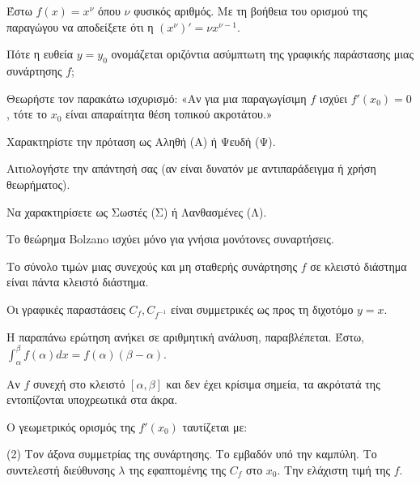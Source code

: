 \documentclass[11pt,a4paper]{article}
\newcommand{\kerkissans}[1]{{\fontfamily{maksf}\selectfont \textbf{#1}}}
\renewcommand{\textdexiakeraia}{}
\newcommand{\dint}{\displaystyle\int}
\newcommand\themanum{A}
\newcounter{thema}[section]
\renewcommand{\thethema}{\arabic{thema}}
\newcommand{\Thema}{\refstepcounter{thema}{\textbf{\textcolor{black}{\faPenSquare\ \  \large \kerkissans{\textbf{\thethemaο\hspace{2mm}Διαγώνισμα - Θέμα \themanum}}}}}\hspace{0mm}}{}
\newenvironment{thema}[1]
{\begin{tcolorbox}[title=\Thema\kerkissans{\textbf{\large{  #1}}},breakable,
enhanced standard,titlerule=0pt,toprule=0pt, rightrule=0pt, bottomrule=0pt,
colback=white,left=0mm,top=1mm,bottom=0mm,
boxrule=0pt,
colframe=white,leftrule=0mm,sharp corners,coltitle=black]
\renewcommand{\themanum}{#1}}
{\end{tcolorbox}}
\begin{document}
\begin{thema}{A}
\begin{erwthma}
    \item Έστω $f(x) = x^\nu$ όπου $\nu$ φυσικός αριθμός. Με τη βοήθεια του ορισμού της παραγώγου να αποδείξετε ότι η $(x^\nu)' = \nu x^{\nu - 1}$.
    \item Πότε η ευθεία $y=y_0$ ονομάζεται οριζόντια ασύμπτωτη της γραφικής παράστασης μιας συνάρτησης $f$;
    \item Θεωρήστε τον παρακάτω ισχυρισμό:
    «Αν για μια παραγωγίσιμη $f$ ισχύει $f'(x_0) = 0$, τότε το $x_0$ είναι απαραίτητα θέση τοπικού ακροτάτου.»
    \begin{alist}
    \item Χαρακτηρίστε την πρόταση ως Αληθή (Α) ή Ψευδή (Ψ).
    \item Αιτιολογήστε την απάντησή σας (αν είναι δυνατόν με αντιπαράδειγμα ή χρήση θεωρήματος).
    \end{alist}
    \item Να χαρακτηρίσετε ως Σωστές (Σ) ή Λανθασμένες (Λ).
    \begin{alist}
        \item Το θεώρημα Bolzano ισχύει μόνο για γνήσια μονότονες συναρτήσεις.
        \item Το σύνολο τιμών μιας συνεχούς και μη σταθερής συνάρτησης $f$ σε κλειστό διάστημα είναι πάντα κλειστό διάστημα.
        \item Οι γραφικές παραστάσεις $C_f, C_{f^{-1}}$ είναι συμμετρικές ως προς τη διχοτόμο $y=x$.
        \item H παραπάνω ερώτηση ανήκει σε αριθμητική ανάλυση, παραβλέπεται. Έστω, $\dint_{\alpha}^{\beta} f(\alpha) dx = f(\alpha)(\beta - \alpha)$.
        \item Αν $f$ συνεχή στο κλειστό $[\alpha, \beta]$ και δεν έχει κρίσιμα σημεία, τα ακρότατά της εντοπίζονται υποχρεωτικά στα άκρα.
    \end{alist}
    \item Ο γεωμετρικός ορισμός της $f'(x_0)$ ταυτίζεται με:
    \begin{tasks}[label=\let\textdexiakeraia\relax\alph*.](2)
        \task Τον άξονα συμμετρίας της συνάρτησης.
        \task Το εμβαδόν υπό την καμπύλη.
        \task Το συντελεστή διεύθυνσης $\lambda$ της εφαπτομένης της $C_f$ στο $x_0$.
        \task Την ελάχιστη τιμή της $f$.
    \end{tasks}
\end{erwthma}
\end{thema}
\vspace{1cm}
\end{document}
